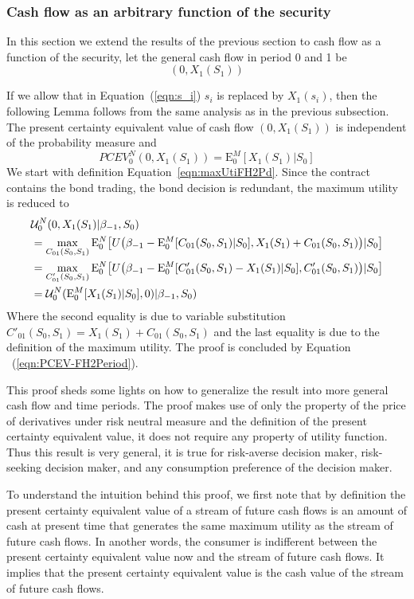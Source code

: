 \documentclass{article}[12pt letter]
\newcommand{\E}{\mathrm{E}}
\begin{document}
\subsubsection{Cash flow as an arbitrary function of the security}
In this section we extend the results of the previous section to cash flow as a function of the security, let the general cash flow in period 0 and 1 be
\[(0, X_1(S_1))\]

If we allow that in Equation~(\ref{eqn:s_i}) $s_i$ is replaced by $X_1(s_i)$, then the following Lemma follows from the same analysis as in the previous subsection. 
{\lemma The present certainty equivalent value of cash flow $(0,X_1(S_1))$ is independent of the probability measure and 
\[PCEV_0^N(0,X_1(S_1)) = \E_0^M[X_1(S_1)|S_0] \]
}
\proof We start with definition Equation~\ref{eqn:maxUtiFH2Pd}. Since the contract contains the bond trading, the bond decision is redundant, the maximum utility is reduced to 
\begin{align*}
    &\mathcal{U}^N_0(0, X_{1}(S_1)|\beta_{-1},S_0) \nonumber \\
    & = \max_{ C_{01}(S_0,S_1)} \E_0^N \big{[}U\big{(}\beta_{-1}-\E_0^M[C_{01}(S_0,S_1)|S_0],   X_1(S_1)+ C_{01}(S_0,S_1) \big{)}|S_0 \big{]} \\
    & = \max_{ C'_{01}(S_0,S_1)} \E_0^N \big{[}U\big{(}\beta_{-1}-\E_0^M[C'_{01}(S_0,S_1)-X_1(S_1) |S_0],   C'_{01}(S_0,S_1) \big{)}|S_0 \big{]} \\
    & = \mathcal{U}^N_0(\E_0^M[ X_{1}(S_1)|S_0], 0)|\beta_{-1},S_0)
\end{align*}
Where the second equality is due to variable substitution $C'_{01}(S_0,S_1) = X_1(S_1) + C_{01}(S_0,S_1)$ and the last equality is due to the definition of the maximum utility. The proof is concluded by Equation 
~(\ref{eqn:PCEV-FH2Period}). 
\endproof

This proof sheds some lights on how to generalize the result into more general cash flow and time periods. The proof makes use of only the property of the price of derivatives under risk neutral measure and the definition of the present certainty equivalent value, it does not require any property of utility function. Thus this result is very general, it is true for risk-averse decision maker, risk-seeking decision maker, and any consumption preference of the decision maker. 

To understand the intuition behind this proof, we first note that by definition the present certainty equivalent value of a stream of future cash flows is an amount of cash at present time that generates the same maximum utility as the stream of future cash flows. In another words, the consumer is indifferent between the present certainty equivalent value now and the stream of future cash flows. It implies that the present certainty equivalent value is the cash value of the stream of future cash flows. 
\end{document}
